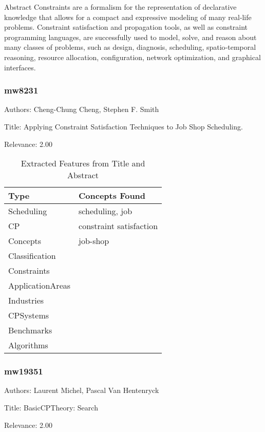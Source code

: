 Abstract 
           Constraints are a formalism for the representation of declarative knowledge that allows for a compact and expressive modeling of many real‐life problems. Constraint satisfaction and propagation tools, as well as constraint programming languages, are successfully used to model, solve, and reason about many classes of problems, such as design, diagnosis, scheduling, spatio‐temporal reasoning, resource allocation, configuration, network optimization, and graphical interfaces. 

\subsubsection{mw8231}
\label{mw:mw8231}

Authors: Cheng-Chung Cheng, Stephen F. Smith

Title: Applying Constraint Satisfaction Techniques to Job Shop Scheduling.

Relevance:  2.00

{\scriptsize
\begin{longtable}{p{2cm}p{20cm}}
\caption{Extracted Features from Title and Abstract}\\ \toprule
Type & Concepts Found\\ \midrule
\endhead
\bottomrule
\endfoot
Scheduling & scheduling, job\\ 
CP & constraint satisfaction\\ 
Concepts & job-shop\\ 
Classification & \\ 
Constraints & \\ 
ApplicationAreas & \\ 
Industries & \\ 
CPSystems & \\ 
Benchmarks & \\ 
Algorithms & \\ 
\end{longtable}
}



\subsubsection{mw19351}
\label{mw:mw19351}

Authors: Laurent Michel, Pascal Van Hentenryck

Title: BasicCPTheory: Search

Relevance:  2.00

